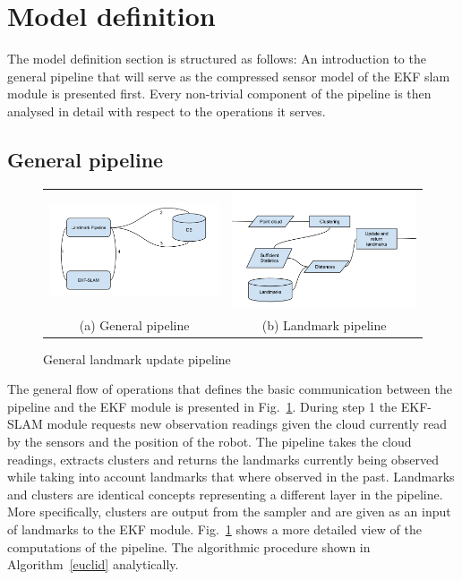 \documentclass[twoside,hidelinks]{article}
\begin{document}
\newpage
\section{Model definition}
\label{sec:model}

The model definition section is structured as follows: An introduction to the general pipeline that will serve as the compressed sensor model of the EKF slam module is presented first. Every non-trivial component of the pipeline is then analysed in detail with respect to the operations it serves.

\subsection{General pipeline}

\begin{figure}
\begin{tabular}{cc}
  \includegraphics[width=.33\textwidth]{workflowGen} &    \includegraphics[width=.33\textwidth]{workflowSpec} \\
(a) General pipeline & (b) Landmark pipeline \\[6pt]
\end{tabular}
\caption{General landmark update pipeline}
\label{pipeline}
\end{figure}


The general flow of operations that defines the basic communication between the pipeline and the EKF module is presented in Fig.~\ref{pipeline}. During step 1 the EKF-SLAM module requests new observation readings given the cloud currently read by the sensors and the position of the robot. The pipeline takes the cloud readings, extracts clusters and returns the landmarks currently being observed while taking into account landmarks that where observed in the past. Landmarks and clusters are identical concepts representing a different layer in the pipeline. More specifically, clusters are output from the sampler and are given as an input of landmarks to the EKF module. Fig.~\ref{pipeline} shows a more detailed view of the computations of the pipeline. The algorithmic procedure shown in Algorithm~\ref{euclid} analytically.
\end{document}
